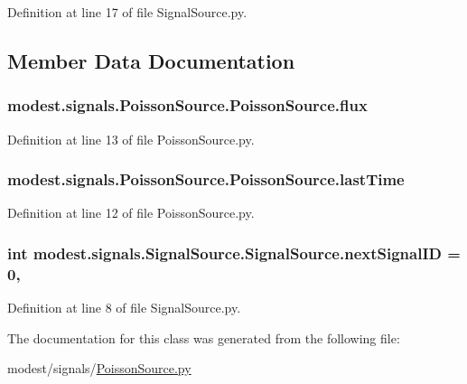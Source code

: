 Definition at line 17 of file Signal\+Source.\+py.



\subsection{Member Data Documentation}
\subsubsection[{\texorpdfstring{flux}{flux}}]{\setlength{\rightskip}{0pt plus 5cm}modest.\+signals.\+Poisson\+Source.\+Poisson\+Source.\+flux}\hypertarget{classmodest_1_1signals_1_1PoissonSource_1_1PoissonSource_ae0a95ae74b0d1df57ed10a7eeb8fa754}{}\label{classmodest_1_1signals_1_1PoissonSource_1_1PoissonSource_ae0a95ae74b0d1df57ed10a7eeb8fa754}


Definition at line 13 of file Poisson\+Source.\+py.

\subsubsection[{\texorpdfstring{last\+Time}{lastTime}}]{\setlength{\rightskip}{0pt plus 5cm}modest.\+signals.\+Poisson\+Source.\+Poisson\+Source.\+last\+Time}\hypertarget{classmodest_1_1signals_1_1PoissonSource_1_1PoissonSource_a982ffe5add48d52a24d16483c7a26a5b}{}\label{classmodest_1_1signals_1_1PoissonSource_1_1PoissonSource_a982ffe5add48d52a24d16483c7a26a5b}


Definition at line 12 of file Poisson\+Source.\+py.

\subsubsection[{\texorpdfstring{next\+Signal\+ID}{nextSignalID}}]{\setlength{\rightskip}{0pt plus 5cm}int modest.\+signals.\+Signal\+Source.\+Signal\+Source.\+next\+Signal\+ID = 0\hspace{0.3cm}{\ttfamily [static]}, {\ttfamily [inherited]}}\hypertarget{classmodest_1_1signals_1_1SignalSource_1_1SignalSource_a7a87b05025246170067fbf9ed3ef49fd}{}\label{classmodest_1_1signals_1_1SignalSource_1_1SignalSource_a7a87b05025246170067fbf9ed3ef49fd}


Definition at line 8 of file Signal\+Source.\+py.



The documentation for this class was generated from the following file\+:\begin{DoxyCompactItemize}
\item 
modest/signals/\hyperlink{PoissonSource_8py}{Poisson\+Source.\+py}\end{DoxyCompactItemize}
